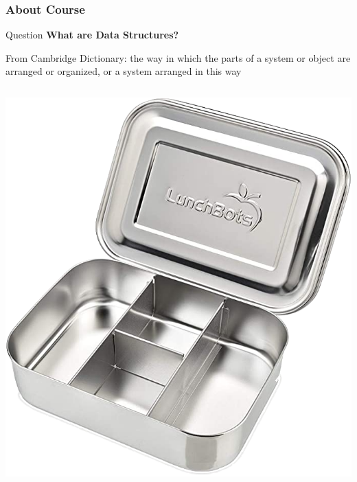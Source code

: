 \documentclass[aspectratio=169, 14pt]{beamer}
\begin{document}


\begin{frame}[fragile]
	\frametitle{About Course}
	\begin{exampleblock}{Question}
		\textbf{What are \alert{Data Structures}?}
	\end{exampleblock}

	\begin{displayquote}
		From Cambridge Dictionary: the way in which the parts of a system or object are arranged or organized, or a system arranged in this way
	\end{displayquote}

	\begin{columns}
		\includegraphics[height=.4\paperheight]{week0/box1}%

\end{columns}
\end{frame}
\end{document}
